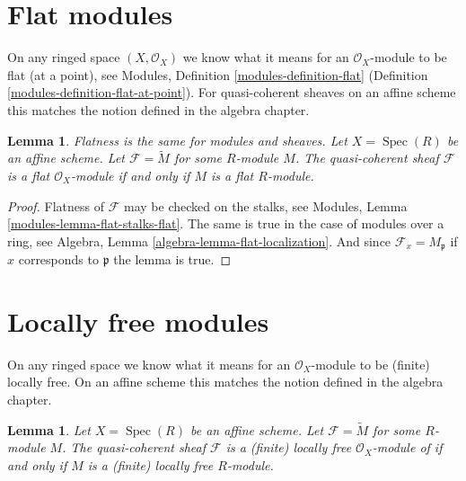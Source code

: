 \documentclass{stacks-project}
\newenvironment{slogan}{\comment}{\endcomment}
\theoremstyle{plain}
\newtheorem{lemma}[subsection]{Lemma}
\theoremstyle{definition}
\theoremstyle{remark}
\numberwithin{equation}{subsection}
\def\Spec{\mathop{\mathrm{Spec}}}
\begin{document}
\section{Flat modules}
\label{section-flat}

\noindent
On any ringed space $(X, \mathcal{O}_X)$
we know what it means for an $\mathcal{O}_X$-module
to be flat (at a point), see
Modules, Definition \ref{modules-definition-flat}
(Definition \ref{modules-definition-flat-at-point}).
For quasi-coherent sheaves on an affine scheme this matches the notion
defined in the algebra chapter.

\begin{lemma}
\label{lemma-flat-module}
\begin{slogan}
Flatness is the same for modules and sheaves.
\end{slogan}
Let $X = \Spec(R)$ be an affine scheme.
Let $\mathcal{F} = \widetilde{M}$ for some $R$-module $M$.
The quasi-coherent sheaf $\mathcal{F}$ is a flat
$\mathcal{O}_X$-module if and only if $M$ is a flat $R$-module.
\end{lemma}

\begin{proof}
Flatness of $\mathcal{F}$ may be checked on the stalks, see
Modules, Lemma \ref{modules-lemma-flat-stalks-flat}.
The same is true in the case of modules over a ring, see
Algebra, Lemma \ref{algebra-lemma-flat-localization}.
And since $\mathcal{F}_x = M_{\mathfrak p}$ if $x$ corresponds
to $\mathfrak p$ the lemma is true.
\end{proof}





\section{Locally free modules}
\label{section-finite-locally-free}

\noindent
On any ringed space we know what it means for an $\mathcal{O}_X$-module
to be (finite) locally free. On an affine scheme this matches the notion
defined in the algebra chapter.

\begin{lemma}
\label{lemma-locally-free-module}
Let $X = \Spec(R)$ be an affine scheme.
Let $\mathcal{F} = \widetilde{M}$ for some $R$-module $M$.
The quasi-coherent sheaf $\mathcal{F}$ is a (finite) locally free
$\mathcal{O}_X$-module of if and only if $M$ is a (finite)
locally free $R$-module.
\end{lemma}
\end{document}
